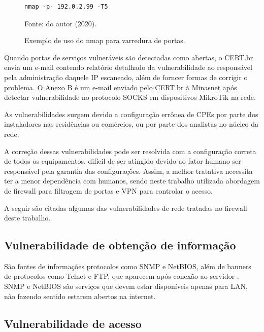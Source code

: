     \begin{figure}[!htb]
        \centering
        \caption{Exemplo de uso do nmap para varredura de portas.} 
        \label{fig:nmap} 
        
        \begin{Verbatim}[fontsize=\small]
            nmap -p- 192.0.2.99 -T5
        \end{Verbatim} 
        
        {\small Fonte: do autor (2020).} 
    \end{figure}
    
    Quando portas de serviços vulneráveis são detectadas como abertas, o CERT.br envia um e-mail contendo relatório detalhado da vulnerabilidade ao responsável pela administração daquele IP escaneado, além de forncer formas de corrigir o problema. O Anexo B é um e-mail enviado pelo CERT.br à Minasnet após detectar vulnerabilidade no protocolo SOCKS em dispositivos MikroTik na rede.
    
    As vulnerabilidades surgem devido a configuração errônea de CPEs por parte dos instaladores nas residências ou comércios, ou por parte dos analistas no núcleo da rede. 
    
    A correção dessas vulnerabilidades pode ser resolvida com a configuração correta de todos os equipamentos, difícil de ser atingido devido ao fator humano ser responsável pela garantia das configurações. Assim, a melhor tratativa necessita ter a menor dependência com humanos, sendo neste trabalho utilizada abordagem de firewall para filtragem de portas e VPN para controlar o acesso.
    
    A seguir são citadas algumas das vulnerabilidades de rede tratadas no firewall deste trabalho.
    
\subsection{Vulnerabilidade de obtenção de informação}
    
    São fontes de informações protocolos como SNMP e NetBIOS, além de banners de protocolos como Telnet e FTP, que aparecem após conexão ao servidor \cite{nakamura2007}. SNMP e NetBIOS são serviços que devem estar disponíveis apenas para LAN, não fazendo sentido estarem abertos na internet.

\subsection{Vulnerabilidade de acesso}

